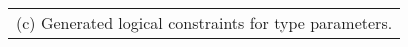 \scriptsize
\begin{tabular}[t]{l}
	(c) Generated logical constraints for type parameters.
\end{tabular}